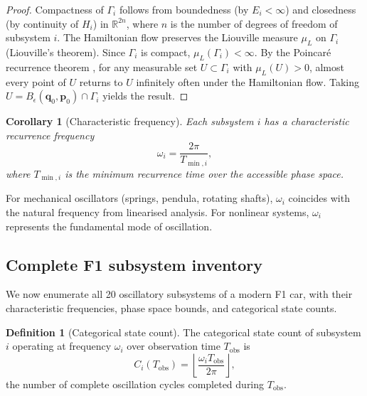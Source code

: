 \documentclass[twocolumn,10pt,a4paper]{article}
\newtheorem{corollary}[theorem]{Corollary}
\theoremstyle{definition}
\newtheorem{definition}[theorem]{Definition}
\theoremstyle{remark}
\newcommand{\R}{\mathbb{R}}
\newcommand{\vect}[1]{\boldsymbol{#1}}
\begin{document}
\begin{proof}
Compactness of $\Gamma_i$ follows from boundedness (by $E_i < \infty$) and closedness (by continuity of $H_i$) in $\R^{2n}$, where $n$ is the number of degrees of freedom of subsystem $i$. The Hamiltonian flow preserves the Liouville measure $\mu_L$ on $\Gamma_i$ (Liouville's theorem). Since $\Gamma_i$ is compact, $\mu_L(\Gamma_i) < \infty$. By the Poincar\'{e} recurrence theorem \citep{Poincare1890}, for any measurable set $U \subset \Gamma_i$ with $\mu_L(U) > 0$, almost every point of $U$ returns to $U$ infinitely often under the Hamiltonian flow. Taking $U = B_\epsilon(\vect{q}_0, \vect{p}_0) \cap \Gamma_i$ yields the result.
\end{proof}

\begin{corollary}[Characteristic frequency]\label{cor:frequency}
Each subsystem $i$ has a characteristic recurrence frequency
\begin{equation}\label{eq:frequency}
    \omega_i = \frac{2\pi}{T_{\min,i}},
\end{equation}
where $T_{\min,i}$ is the minimum recurrence time over the accessible phase space.
\end{corollary}

For mechanical oscillators (springs, pendula, rotating shafts), $\omega_i$ coincides with the natural frequency from linearised analysis. For nonlinear systems, $\omega_i$ represents the fundamental mode of oscillation.

\subsection{Complete F1 subsystem inventory}

We now enumerate all 20 oscillatory subsystems of a modern F1 car, with their characteristic frequencies, phase space bounds, and categorical state counts.

\begin{definition}[Categorical state count]\label{def:cat_state}
The categorical state count of subsystem $i$ operating at frequency $\omega_i$ over observation time $T_{\mathrm{obs}}$ is
\begin{equation}\label{eq:cat_count}
    C_i(T_{\mathrm{obs}}) = \left\lfloor \frac{\omega_i T_{\mathrm{obs}}}{2\pi} \right\rfloor,
\end{equation}
the number of complete oscillation cycles completed during $T_{\mathrm{obs}}$.
\end{definition}
\end{document}
